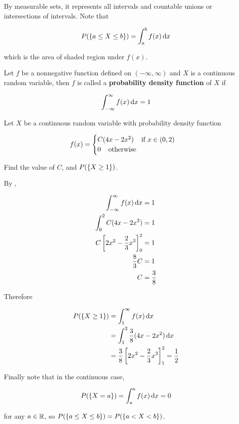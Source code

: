 \documentclass[a4paper,12pt]{article}
\begin{document}
By measurable sets, it represents all intervals and countable unions or intersections of intervals. Note that

$$P(\left\{ a\leq X\leq b\right\})=\int_{a}^{b}f(x)\,\mathrm{d} x$$\s

which is the area of shaded region under $f(x)$.\n

\begin{dft}
  Let $f$ be a nonnegative function defined on $(-\infty,\infty)$ and $X$ is a continuous random variable, then $f$ is called a \textbf{probability density function} of $X$ if

  $$\int_{-\infty}^{\infty}f(x)\,\mathrm{d} x=1$$
\end{dft}\n

\begin{exm}
  Let $X$ be a continuous random variable with probability density function

  $$f(x)=\begin{cases}
    C(4x-2x^2)\;\;\;\;\text{if }x\in(0,2)\\
    0\;\;\;\;\text{otherwise}
  \end{cases}$$\s

  Find the value of $C$, and $P(\left\{ X\geq 1\right\})$.\n
  
  \ans By \rdft[\sctr{1}],

  $$\begin{aligned}[t]
    \int_{-\infty}^{\infty}f(x)\,\mathrm{d} x&=1\\
    \int_{0}^{2}C(4x-2x^{2})&=1\\
    C\left[ 2x^{2}-\frac{2}{3}x^{3}\right]_{0}^{2}&=1\\
    \frac{8}{3}C&=1\\
    C&=\frac{3}{8}    
  \end{aligned}$$\s

  Therefore

  $$\begin{aligned}[t]
    P(\left\{ X\geq 1\right\})&=\int_{1}^{\infty}f(x)\,\mathrm{d} x\\
    &=\int_{1}^{2}\frac{3}{8}(4x-2x^{2})\,\mathrm{d} x\\
    &=\frac{3}{8}\left[ 2x^{2}-\frac{2}{3}x^{3}\right]_{1}^{2}=\frac{1}{2}
  \end{aligned}$$
\end{exm}\n

Finally note that in the continuous case,

$$P(\left\{ X=a\right\})=\int_{a}^{a}f(x)\,\mathrm{d} x=0$$\s

for any $a\in\mathbb{R}$, so $P(\left\{ a\leq X\leq b\right\})=P(\left\{ a<X<b\right\})$.
\end{document}
